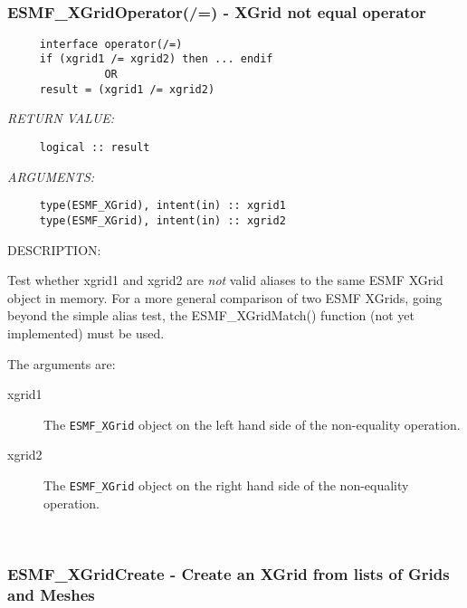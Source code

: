  
\mbox{}\hrulefill\ 
 
\subsubsection [ESMF\_XGridOperator(/=)] {ESMF\_XGridOperator(/=) - XGrid not equal operator}


  
\begin{verbatim}     interface operator(/=)
     if (xgrid1 /= xgrid2) then ... endif
               OR
     result = (xgrid1 /= xgrid2)\end{verbatim}{\em RETURN VALUE:}
\begin{verbatim}     logical :: result\end{verbatim}{\em ARGUMENTS:}
\begin{verbatim}     type(ESMF_XGrid), intent(in) :: xgrid1
     type(ESMF_XGrid), intent(in) :: xgrid2\end{verbatim}
{\sf DESCRIPTION:\\ }


     Test whether xgrid1 and xgrid2 are {\it not} valid aliases to the
     same ESMF XGrid object in memory. For a more general comparison of two ESMF
     XGrids, going beyond the simple alias test, the ESMF\_XGridMatch() function
     (not yet implemented) must be used.
  
     The arguments are:
     \begin{description}
     \item[xgrid1]
       The {\tt ESMF\_XGrid} object on the left hand side of the non-equality
       operation.
     \item[xgrid2]
       The {\tt ESMF\_XGrid} object on the right hand side of the non-equality
       operation.
     \end{description}
   
 
\mbox{}\hrulefill\ 
 
\subsubsection [ESMF\_XGridCreate] {ESMF\_XGridCreate - Create an XGrid from lists of Grids and Meshes}



